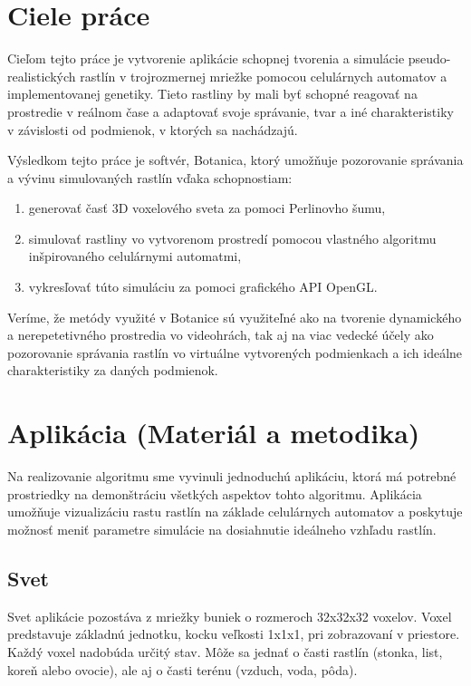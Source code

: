 \documentclass[12pt]{article}
\begin{document}
\section{Ciele práce}

Cieľom tejto práce je vytvorenie aplikácie schopnej tvorenia a simulácie
pseudo-rea\-listických rastlín v trojrozmernej mriežke pomocou celulárnych
automatov a implementovanej genetiky.
Tieto rastliny by mali byť schopné reagovať na prostredie v reálnom čase
a adaptovať svoje správanie, tvar a iné charakteristiky v závislosti
od podmienok, v ktorých sa nachádzajú.

Výsledkom tejto práce je softvér, Botanica, ktorý umožňuje pozorovanie
správania a vývinu simulovaných rastlín vďaka schopnostiam:

\begin{enumerate}
	\item generovať časť 3D voxelového sveta za pomoci Perlinovho šumu,
	\item simulovať rastliny vo vytvorenom prostredí pomocou vlastného
	      algoritmu inšpirovaného celulárnymi automatmi,
	\item vykresľovať túto simuláciu za pomoci grafického API OpenGL.
\end{enumerate}

Veríme, že metódy využité v Botanice sú využiteľné ako na tvorenie dynamického
a nerepetetivného prostredia vo videohrách, tak aj na viac vedecké účely
ako pozorovanie správania rastlín vo virtuálne vytvorených podmienkach
a ich ideálne charakteristiky za daných podmienok.


\section{Aplikácia (Materiál a metodika)}

Na realizovanie algoritmu sme vyvinuli jednoduchú aplikáciu, ktorá má
potrebné prostriedky na demonštráciu všetkých aspektov tohto algoritmu.
Aplikácia umožňuje vizualizáciu rastu rastlín na základe celulárnych automatov
a poskytuje možnosť meniť parametre simulácie na dosiahnutie ideálneho vzhľadu
rastlín.

\subsection{Svet} \label{subsec:svet}

Svet aplikácie pozostáva z mriežky buniek o rozmeroch 32x32x32 voxelov.
Voxel predstavuje základnú jednotku, kocku veľkosti 1x1x1, pri zobrazovaní v priestore.
Každý voxel nadobúda určitý stav. Môže sa jednať o časti rastlín (stonka, list,
koreň alebo ovocie), ale aj o časti terénu (vzduch, voda, pôda).
\end{document}

